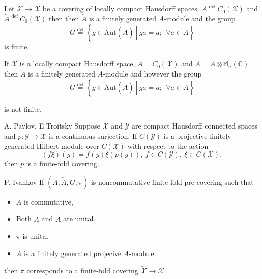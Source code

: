\documentclass{beamer}
\theoremstyle{plain}
\newcommand{\be}{\begin{equation}}
\newcommand{\ee}{\end{equation}}
\newcommand{\Aut}{\mathrm{Aut}}
\newcommand{\sX}{\mathcal{X}}       %
\newcommand{\bydef}{\stackrel{\mathrm{def}}{=}}
\begin{document}
\begin{frame}
\begin{example}
Let $\widetilde{\sX} \to \sX$ be a covering of locally compact Hausdorff spaces.
 $A \bydef C_0\left(\mathcal{X}\right)$ and $\widetilde{A}\bydef C_0\left(\mathcal{X}\right)$ then then $\widetilde{A}$ is a finitely generated $A$-module and the group
			\be\nonumber
G \bydef \left\{ \left.g \in \Aut\left(\widetilde{A} \right)~\right|~ ga = a;~~\forall a \in A\right\}
\ee
is finite.
\end{example}\begin{example}
If $\mathcal{X}$ is a locally compact Hausdorff space, $A = C_0\left(\mathcal{X}\right)$ and $\widetilde{A}= A\otimes \mathbb{M}_n\left(\mathbb{C} \right)$  then $\widetilde{A}$ is a finitely generated $A$-module and however the group
\be\nonumber
G \bydef \left\{ \left.g \in \Aut\left(\widetilde{A} \right)~\right|~ ga = a;~~\forall a \in A\right\}
\ee

is not finite.
\end{example}
\end{frame}
\begin{frame}

	\begin{theorem}\alert{A. Pavlov, E Troitsky}
		Suppose $\mathcal X$ and $\mathcal Y$ are compact Hausdorff connected spaces and $p :\mathcal  Y \to \mathcal X$
is a continuous surjection. If $C(\mathcal Y )$ is a projective finitely generated Hilbert module over
$C(\mathcal X)$ with respect to the action
\begin{equation*}
(f\xi)(y) = f(y)\xi(p(y)), ~ f \in  C(\mathcal Y ), ~ \xi \in  C(\mathcal X),
\end{equation*}
then $p$ is a finite-fold  covering.
	\end{theorem}


\begin{corollary}\alert{P. Ivankov}
	If $\left(A, \widetilde{A}, G, \pi \right)$ is noncommutative finite-fold  pre-covering such that
	\begin{itemize}
		\item $A$ is commutative,
		\item Both $A$ and $\widetilde{A}$ are unital.
		\item $\pi$ is unital 
	\item $\widetilde{A}$	is a finitely generated projecive $A$-module.
	\end{itemize}
	then $\pi$ corresponds to a finite-fold covering $ \widetilde{\mathcal  X}\to \mathcal  X$.
\end{corollary}
\end{frame}
\end{document}
